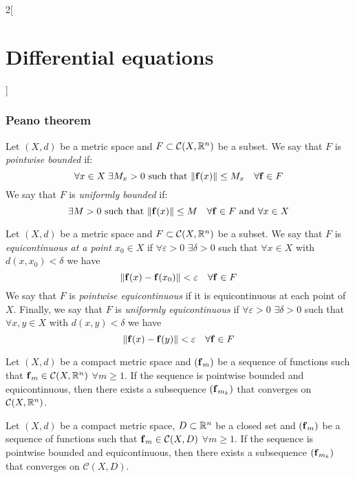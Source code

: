 \documentclass[../../../main.tex]{subfiles}
\begin{document}
\begin{multicols}{2}[\section{Differential equations}]
  \subsubsection{Peano theorem}
  \begin{definition}
    Let $(X,d)$ be a metric space and $F\subset\mathcal{C}(X,\mathbb{R}^n)$ be a subset. We say that $F$ is \textit{pointwise bounded} if: $$\forall x\in X\;\exists M_x>0\text{ such that }\|\boldsymbol{\mathrm{f}}(x)\|\leq M_x\quad\forall\boldsymbol{\mathrm{f}}\in F$$
    We say that $F$ is \textit{uniformly bounded} if: $$\exists M>0\text{ such that }\|\boldsymbol{\mathrm{f}}(x)\|\leq M \quad\forall\boldsymbol{\mathrm{f}}\in F\text{ and }\forall x\in X$$
  \end{definition}
  \begin{definition}
    Let $(X,d)$ be a metric space and $F\subset\mathcal{C}(X,\mathbb{R}^n)$ be a subset. We say that $F$ is \textit{equicontinuous at a point $x_0\in X$} if $\forall \varepsilon>0$ $\exists \delta>0$ such that $\forall x\in X$ with $d(x,x_0)<\delta$ we have $$\|\boldsymbol{\mathrm{f}}(x)-\boldsymbol{\mathrm{f}}(x_0)\|<\varepsilon\quad\forall\boldsymbol{\mathrm{f}}\in F$$
    We say that $F$ is \textit{pointwise equicontinuous} if it is equicontinuous at each point of $X$. Finally, we say that $F$ is \textit{uniformly equicontinuous} if $\forall \varepsilon>0$ $\exists \delta>0$ such that $\forall x,y\in X$ with $d(x,y)<\delta$ we have $$\|\boldsymbol{\mathrm{f}}(x)-\boldsymbol{\mathrm{f}}(y)\|<\varepsilon\quad\forall\boldsymbol{\mathrm{f}}\in F$$
  \end{definition}
  \begin{theorem}
    Let $(X,d)$ be a compact metric space and $(\boldsymbol{\mathrm{f}}_m)$ be a sequence of functions such that $\boldsymbol{\mathrm{f}}_m\in\mathcal{C}(X,\mathbb{R}^n)$ $\forall m\geq 1$. If the sequence is pointwise bounded and equicontinuous, then there exists a subsequence $(\boldsymbol{\mathrm{f}}_{m_k})$ that converges on $\mathcal{C}(X,\mathbb{R}^n)$.
  \end{theorem}
  \begin{corollary}
    Let $(X,d)$ be a compact metric space, $D\subset\mathbb{R}^n$ be a closed set and $(\boldsymbol{\mathrm{f}}_m)$ be a sequence of functions such that $\boldsymbol{\mathrm{f}}_m\in\mathcal{C}(X,D)$ $\forall m\geq 1$. If the sequence is pointwise bounded and equicontinuous, then there exists a subsequence $(\boldsymbol{\mathrm{f}}_{m_k})$ that converges on $\mathcal{C}(X,D)$.
  \end{corollary}
  \begin{theorem}

\end{theorem}
\end{multicols}
\end{document}
